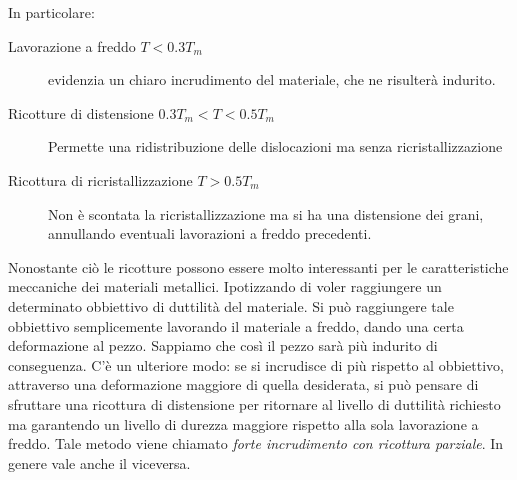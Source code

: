 In particolare:
\begin{description}
\item[Lavorazione a freddo $T < 0.3 T_m$] evidenzia un chiaro incrudimento del materiale, che ne risulterà indurito.
\item[Ricotture di distensione $0.3T_m < T < 0.5 T_m$] Permette una ridistribuzione delle dislocazioni ma senza ricristallizzazione
\item[Ricottura di ricristallizzazione $T > 0.5 T_m$] Non è scontata la ricristallizzazione ma si ha una distensione dei grani, annullando eventuali lavorazioni a freddo precedenti.
\end{description}
Nonostante ciò le ricotture possono essere molto interessanti per le caratteristiche meccaniche dei materiali metallici.
Ipotizzando di voler raggiungere un determinato obbiettivo di duttilità del materiale. Si può raggiungere tale obbiettivo semplicemente lavorando il materiale a freddo, dando una certa deformazione al pezzo.
Sappiamo che così il pezzo sarà più indurito di conseguenza.
C'è un ulteriore modo: se si incrudisce di più rispetto al obbiettivo, attraverso una deformazione maggiore di quella desiderata, si può pensare di sfruttare una ricottura di distensione per ritornare al livello di duttilità richiesto ma garantendo un livello di durezza maggiore rispetto alla sola lavorazione a freddo.
Tale metodo viene chiamato \textit{forte incrudimento con ricottura parziale}.
In genere vale anche il viceversa. 